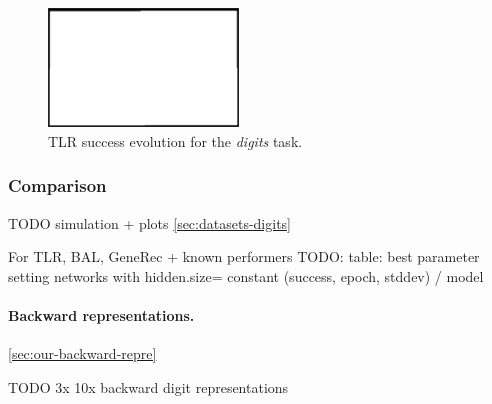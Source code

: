 \begin{figure}[H]
  \centering
  \includegraphics[width=0.45\textwidth]{img/placeholder.png}  %
  \caption{TLR success evolution for the \emph{digits} task.}
  \label{fig:results-tlr-digits-epoch} 
\end{figure}

\subsubsection{Comparison} 
\label{sec:results-cmp-digits} 
TODO simulation + plots \ref{sec:datasets-digits} 

For TLR, BAL, GeneRec + known performers 
TODO: table: best parameter setting networks with hidden.size= constant (success, epoch, stddev) / model \\

\paragraph{Backward representations.} 
\ref{sec:our-backward-repre} 

TODO 3x 10x backward digit representations 

